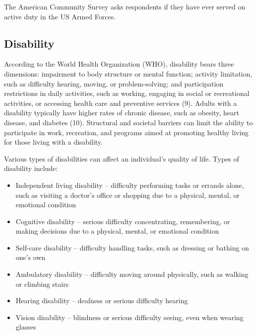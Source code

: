 \documentclass[
  english,
  letterpaper,
]{report}
\begin{document}
\begin{tcolorbox}[enhanced jigsaw, breakable, leftrule=.75mm, title=\textcolor{quarto-callout-note-color}{\faInfo}\hspace{0.5em}{Note}, bottomrule=.15mm, opacityback=0, left=2mm, colback=white, bottomtitle=1mm, coltitle=black, colbacktitle=quarto-callout-note-color!10!white, colframe=quarto-callout-note-color-frame, opacitybacktitle=0.6, toptitle=1mm, titlerule=0mm, arc=.35mm, rightrule=.15mm, toprule=.15mm]

The American Community Survey asks respondents if they have ever served
on active duty in the US Armed Forces.

\end{tcolorbox}

\subsection{Disability}\label{disability}

According to the World Health Organization (WHO), disability bears three
dimensions: impairment to body structure or mental function; activity
limitation, such as difficulty hearing, moving, or problem-solving; and
participation restrictions in daily activities, such as working,
engaging in social or recreational activities, or accessing health care
and preventive services (9). Adults with a disability typically have
higher rates of chronic disease, such as obesity, heart disease, and
diabetes (10). Structural and societal barriers can limit the ability to
participate in work, recreation, and programs aimed at promoting healthy
living for those living with a disability.

Various types of disabilities can affect an individual's quality of
life. Types of disability include:

\begin{itemize}
\item
  Independent living disability -- difficulty performing tasks or
  errands alone, such as visiting a doctor's office or shopping due to a
  physical, mental, or emotional condition
\item
  Cognitive disability -- serious difficulty concentrating, remembering,
  or making decisions due to a physical, mental, or emotional condition
\item
  Self-care disability -- difficulty handling tasks, such as dressing or
  bathing on one's own
\item
  Ambulatory disability -- difficulty moving around physically, such as
  walking or climbing stairs
\item
  Hearing disability -- deafness or serious difficulty hearing
\item
  Vision disability -- blindness or serious difficulty seeing, even when
  wearing glasses
\end{itemize}
\end{document}
